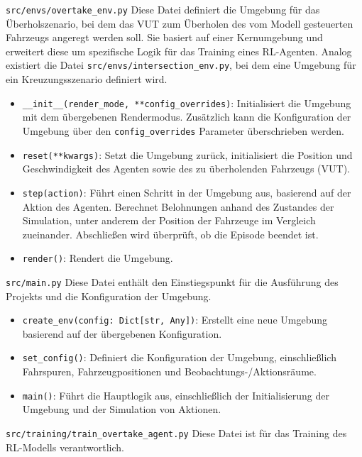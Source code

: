 \texttt{src/envs/overtake\_env.py}
Diese Datei definiert die Umgebung für das Überholszenario, bei dem das VUT zum Überholen des vom Modell gesteuerten Fahrzeugs angeregt werden soll. Sie basiert auf einer Kernumgebung und erweitert diese um spezifische Logik für das Training eines RL-Agenten.
Analog existiert die Datei \texttt{src/envs/intersection\_env.py}, bei dem eine Umgebung für ein Kreuzungsszenario definiert wird.

\begin{itemize}
    \item \texttt{\_\_init\_\_(render\_mode, **config\_overrides)}: Initialisiert die Umgebung mit dem übergebenen Rendermodus. Zusätzlich kann die Konfiguration der Umgebung über den \texttt{config\_overrides} Parameter überschrieben werden.
    \item \texttt{reset(**kwargs)}: Setzt die Umgebung zurück, initialisiert die Position und Geschwindigkeit des Agenten sowie des zu überholenden Fahrzeugs (VUT).
    \item \texttt{step(action)}: Führt einen Schritt in der Umgebung aus, basierend auf der Aktion des Agenten. Berechnet Belohnungen anhand des Zustandes der Simulation, unter anderem der Position der Fahrzeuge im Vergleich zueinander. Abschließen wird überprüft, ob die Episode beendet ist. 
    \item \texttt{render()}: Rendert die Umgebung.
\end{itemize}

\texttt{src/main.py}
Diese Datei enthält den Einstiegspunkt für die Ausführung des Projekts und die Konfiguration der Umgebung.

\begin{itemize}
    \item \texttt{create\_env(config: Dict[str, Any])}: Erstellt eine neue Umgebung basierend auf der übergebenen Konfiguration.
    \item \texttt{set\_config()}: Definiert die Konfiguration der Umgebung, einschließlich Fahrspuren, Fahrzeugpositionen und Beobachtungs-/Aktionsräume.
    \item \texttt{main()}: Führt die Hauptlogik aus, einschließlich der Initialisierung der Umgebung und der Simulation von Aktionen.
\end{itemize}

\texttt{src/training/train\_overtake\_agent.py}
Diese Datei ist für das Training des RL-Modells verantwortlich.

